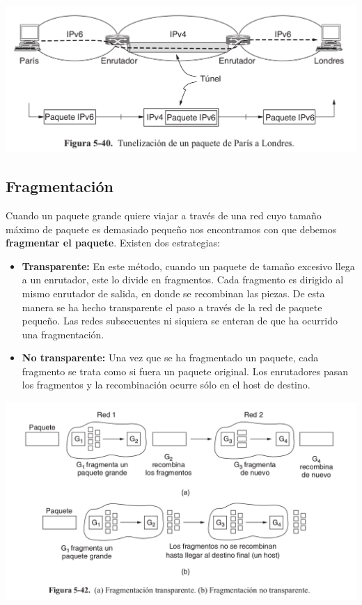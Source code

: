 \documentclass[10pt,a4paper]{report}
\begin{document}
	\begin{center}
		\includegraphics[scale=0.3]{./imagenes/entunelamiento.png}
	\end{center}

	\subsection{Fragmentación}
	Cuando un paquete grande quiere viajar a través de una red cuyo tamaño máximo de paquete es demasiado pequeño nos encontramos con que debemos \textbf{fragmentar el paquete}.
	Existen dos estrategias:

	\begin{itemize}
		\item \textbf{Transparente:} En este método, cuando un paquete de tamaño excesivo
llega a un enrutador, este lo divide en fragmentos. Cada fragmento es dirigido al mismo enrutador
de salida, en donde se recombinan las piezas. De esta manera se ha hecho transparente el paso a
través de la red de paquete pequeño. Las redes subsecuentes ni siquiera se enteran de que ha ocurrido
una fragmentación.
		\item \textbf{No transparente:} Una vez que se ha fragmentado un paquete, cada fragmento se trata como si fuera un paquete
original. Los enrutadores pasan los fragmentos y la recombinación
ocurre sólo en el host de destino.
	\end{itemize}

	\begin{center}
		\includegraphics[scale=0.3]{./imagenes/fragmentacion.png}
	\end{center}
\end{document}
